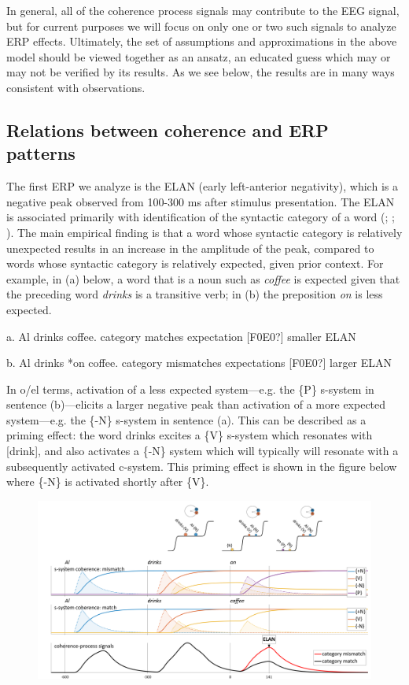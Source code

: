 In general, all of the coherence process signals may contribute to the EEG signal, but for current purposes we will focus on only one or two such signals to analyze ERP effects. Ultimately, the set of assumptions and approximations in the above model should be viewed together as an ansatz, an educated guess which may or may not be verified by its results. As we see below, the results are in many ways consistent with observations.

\subsection{Relations between coherence and ERP patterns}

The first ERP we analyze is the ELAN (early left-anterior negativity), which is a negative peak observed from 100-300 ms after stimulus presentation. The ELAN is associated primarily with identification of the syntactic category of a word (\citealt{Friederici2002}; \citealt{HahneFriederici1999}; \citealt{SteinhauerDrury2012}). The main empirical finding is that a word whose syntactic category is relatively unexpected results in an increase in the amplitude of the peak, compared to words whose syntactic category is relatively expected, given prior context. For example, in (a) below, a word that is a noun such as \textit{coffee} is expected given that the preceding word \textit{drinks} is a transitive verb; in (b) the preposition \textit{on} is less expected.

a. Al drinks coffee.         category matches expectation [F0E0?] smaller ELAN

b. Al drinks *on coffee.    category mismatches expectations [F0E0?] larger ELAN

In o/el terms, activation of a less expected system—e.g. the \{P\} s-system in sentence (b)—elicits a larger negative peak than activation of a more expected system—e.g. the \{-N\} s-system in sentence (a). This can be described as a priming effect: the word drinks excites a \{V\} s-system which resonates with [drink], and also activates a \{-N\} system which will typically will resonate with a subsequently activated c-system. This priming effect is shown in the figure below where \{-N\} is activated shortly after \{V\}. 

  
\begin{figure}
\includegraphics[width=\textwidth]{figures/Tilsen-img142.png}
\caption{\missingcaption}
\label{fig:}
\end{figure}
 

